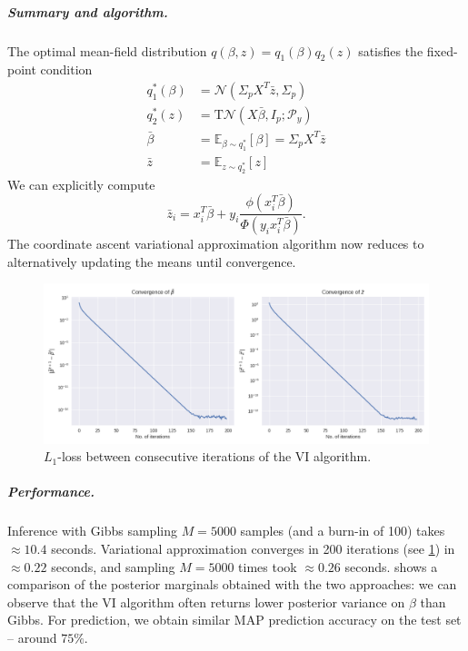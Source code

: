 \documentclass[11pt]{article}
\newcommand\EE{\mathbb{E}}
\newcommand{\calP}{\mathcal{P}}
\newcommand{\calN}{\mathcal{N}}
\begin{document}
\subparagraph{Summary and algorithm.} The optimal mean-field distribution $q(\beta,z) = q_1(\beta)q_2(z)$ satisfies the fixed-point condition
\begin{subequations}\label{eq:VBfixedPoint}
\begin{align}
	q_1^*(\beta) &= \calN(\Sigma_pX^T\bar{z}, \Sigma_p)  \\
	q_2^*(z) &= \mathrm{T}\calN(X\bar{\beta}, I_p; \calP_y)  \\
	\bar{\beta} &= \EE_{\beta \sim q^*_1}[\beta] = \Sigma_p X^T\bar{z}  \\
	\bar{z} &= \EE_{z \sim q^*_2}[z]
\end{align}
\end{subequations}
We can explicitly compute
\[
	\bar{z}_i = x_i^T\bar{\beta} + y_i\frac{\phi(x_i^T\bar\beta)}{\Phi(y_i x_i^T\bar\beta)}.
\]
The coordinate ascent variational approximation algorithm now reduces to alternatively updating the means until convergence.


\begin{figure}
	\centering
	\includegraphics[width=\linewidth]{images/VI_mean_convergence.png}
	\caption{$L_1$-loss between consecutive iterations of the VI algorithm.}\label{fig:VI_L1_convergence}
\end{figure}

\subparagraph{Performance.} Inference with Gibbs sampling $M=5000$ samples (and a burn-in of 100) takes $\approx 10.4$ seconds. Variational approximation converges in 200 iterations (see \cref{fig:VI_L1_convergence}) in $\approx 0.22$ seconds, and sampling $M=5000$ times took $\approx 0.26$ seconds.  shows a comparison of the posterior marginals obtained with the two approaches: we can observe that the VI algorithm often returns lower posterior variance on $\beta$ than Gibbs. For prediction, we obtain similar MAP prediction accuracy on the test set -- around $75\%$.
\end{document}
